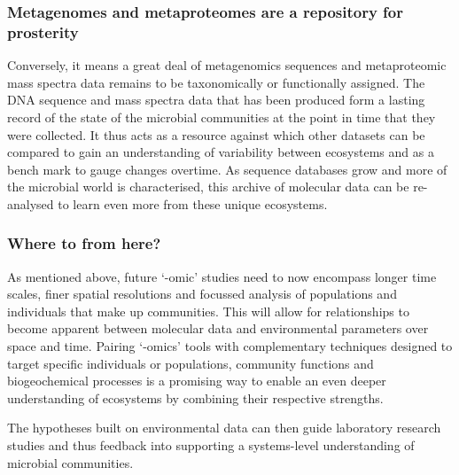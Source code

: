 \subsubsection{Metagenomes and metaproteomes are a repository for prosterity}
Conversely, it means a great deal of metagenomics sequences and metaproteomic mass spectra data remains to be taxonomically or functionally assigned.
The \textsc{DNA} sequence and mass spectra data that has been produced form a lasting record of the state of the microbial communities at the point in time that they were collected.
It thus acts as a resource against which other datasets can be compared to gain an understanding of variability between ecosystems and as a bench mark to gauge changes overtime.
As sequence databases grow and more of the microbial world is characterised, this archive of molecular data can be re-analysed to learn even more from these unique ecosystems.



\subsubsection{Where to from here?}
As mentioned above,
 future `-omic' studies need to now encompass longer time scales, finer spatial resolutions and focussed analysis of populations and individuals that make up communities.
This will allow for relationships to become apparent between molecular data and environmental parameters over space and time.
Pairing `-omics' tools with complementary techniques designed to target specific individuals or populations, community functions and biogeochemical processes is a promising way to enable an even deeper understanding of ecosystems by combining their respective strengths.

The hypotheses built on environmental data can then guide laboratory research studies and thus feedback into supporting a systems-level understanding of microbial communities.

%

